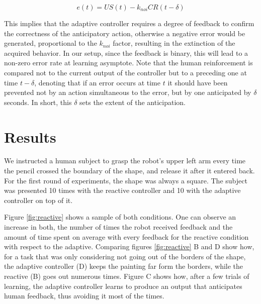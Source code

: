 \documentclass[letterpaper, 10 pt, conference]{ieeeconf}  %
\begin{document}
\[
e(t) = US(t) - k_{noi} CR(t-\delta)
\]

This implies that the adaptive controller requires a degree of feedback to confirm the correctness of the anticipatory action, otherwise a negative error would be generated, proportional to the $k_{noi}$ factor, resulting in the extinction of the acquired behavior. In our setup, since the feedback is binary, this will lead to a non-zero error rate at learning asymptote. Note that the human reinforcement is compared not to the current output of the controller but to a preceding one at time $t-\delta$, denoting that if an error occurs at time $t$ it should have been prevented not by an action simultaneous to the error, but by one anticipated by $\delta$ seconds. In short, this $\delta$ sets the extent of the anticipation.


\section{Results}
\label{sec:results}

We instructed a human subject to grasp the robot's upper left arm every time the pencil crossed the boundary of the shape, and release it after it entered back. For the first round of experiments, the shape was always a square. The subject was presented 10 times with the reactive controller and 10 with the adaptive controller on top of it. 

Figure \ref{fig:reactive} shows a sample of both conditions. One can observe an increase in both, the number of times the robot received feedback and the amount of time spent on average with every feedback for the reactive condition with respect to the adaptive. Comparing figures \ref{fig:reactive} B and D show how, for a task that was only considering not going out of the borders of the shape, the adaptive controller (D) keeps the painting far form the borders, while the reactive (B) goes out numerous times. Figure C shows how, after a few trials of learning, the adaptive controller learns to produce an output that anticipates human feedback, thus avoiding it most of the times. 
\end{document}
